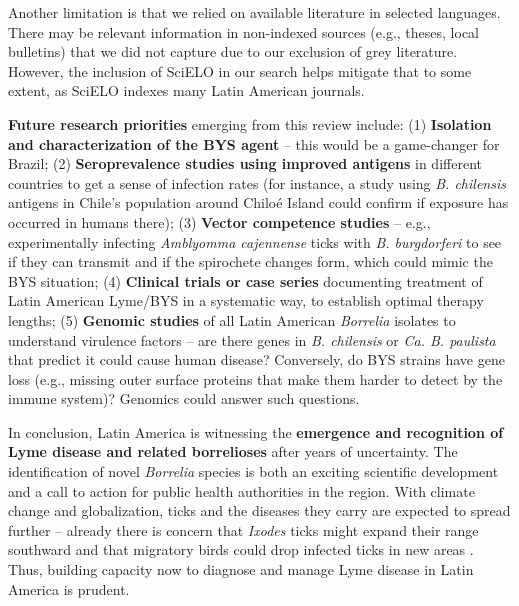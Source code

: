 \documentclass[11pt,letterpaper]{article}
\begin{document}
Another limitation is that we relied on available literature in selected languages. There may be relevant information in non-indexed sources (e.g., theses, local bulletins) that we did not capture due to our exclusion of grey literature. However, the inclusion of SciELO in our search helps mitigate that to some extent, as SciELO indexes many Latin American journals.

\textbf{Future research priorities} emerging from this review include: (1) \textbf{Isolation and characterization of the BYS agent} – this would be a game-changer for Brazil; (2) \textbf{Seroprevalence studies using improved antigens} in different countries to get a sense of infection rates (for instance, a study using \textit{B. chilensis} antigens in Chile's population around Chiloé Island could confirm if exposure has occurred in humans there); (3) \textbf{Vector competence studies} – e.g., experimentally infecting \textit{Amblyomma cajennense} ticks with \textit{B. burgdorferi} to see if they can transmit and if the spirochete changes form, which could mimic the BYS situation; (4) \textbf{Clinical trials or case series} documenting treatment of Latin American Lyme/BYS in a systematic way, to establish optimal therapy lengths; (5) \textbf{Genomic studies} of all Latin American \textit{Borrelia} isolates to understand virulence factors – are there genes in \textit{B. chilensis} or \textit{Ca. B. paulista} that predict it could cause human disease? Conversely, do BYS strains have gene loss (e.g., missing outer surface proteins that make them harder to detect by the immune system)? Genomics could answer such questions.

In conclusion, Latin America is witnessing the \textbf{emergence and recognition of Lyme disease and related borrelioses} after years of uncertainty. The identification of novel \textit{Borrelia} species is both an exciting scientific development and a call to action for public health authorities in the region. With climate change and globalization, ticks and the diseases they carry are expected to spread further – already there is concern that \textit{Ixodes} ticks might expand their range southward and that migratory birds could drop infected ticks in new areas \citep{Binetruy2020l, Binetruy2020m}. Thus, building capacity now to diagnose and manage Lyme disease in Latin America is prudent.
\end{document}
